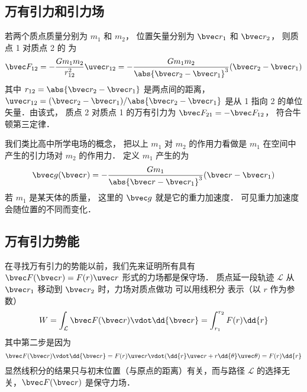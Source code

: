 

\subsection{万有引力和引力场}

若两个质点质量分别为 $m_1$ 和 $m_2$， 位置矢量分别为 $\bvec r_1$ 和 $\bvec r_2$， 则质点 1 对质点 2 的 为
\begin{equation}\label{Gravty_eq1}
\bvec F_{12} =  - \frac{G m_1 m_2}{r_{12}^2} \uvec r_{12} = - \frac{G m_1 m_2}{\abs{\bvec r_2 - \bvec r_1}^3}(\bvec r_2 - \bvec r_1)
\end{equation}
其中 $r_{12} = \abs{\bvec r_2 - \bvec r_1}$ 是两点间的距离，$\uvec r_{12} = (\bvec r_2 - \bvec r_1)/\abs{\bvec r_2 - \bvec r_1}$ 是从 1 指向 2 的单位矢量．由该式， 质点 2 对质点 1 的万有引力为 $\bvec F_{21} = -\bvec F_{12}$， 符合牛顿第三定律．

我们类比高中所学电场的概念， 把以上 $m_1$ 对 $m_2$ 的作用力看做是 $m_1$ 在空间中产生的引力场对 $m_2$ 的作用力． 定义 $m_1$ 产生的为
\begin{equation}\label{Gravty_eq2}
\bvec g(\bvec r) = -\frac{Gm_1}{\abs{\bvec r - \bvec r_1} ^3}(\bvec r - \bvec r_1)
\end{equation}
若 $m_1$ 是某天体的质量， 这里的 $\bvec g$ 就是它的重力加速度． 可见重力加速度会随位置的不同而变化．

\subsection{万有引力势能}

在寻找万有引力的势能以前，我们先来证明所有具有 $\bvec F(\bvec r) = F(r) \uvec r$ 形式的力场都是保守场． 质点延一段轨迹 $\mathcal{L}$ 从 $\bvec r_1$ 移动到 $\bvec r_2$ 时，力场对质点做功 可以用线积分 表示（以 $r$ 作为参数）
\begin{equation}\label{Gravty_eq3}
W = \int_\mathcal{L} \bvec F(\bvec r) \vdot \dd{\bvec r} = \int_{r_1}^{r_2} F(r) \dd{r}
\end{equation}
其中第二步是因为
\begin{equation}
\bvec F(\bvec r) \vdot \dd{\bvec r} = F(r)\uvec  r \vdot (\dd{r} \uvec  r + r\dd{\theta} \uvec \theta ) = F(r) \dd{r}
\end{equation}
显然线积分的结果只与初末位置（与原点的距离）有关，而与路径 $\mathcal{L}$ 的选择无关，$\bvec F(\bvec r)$ 是保守力场．

